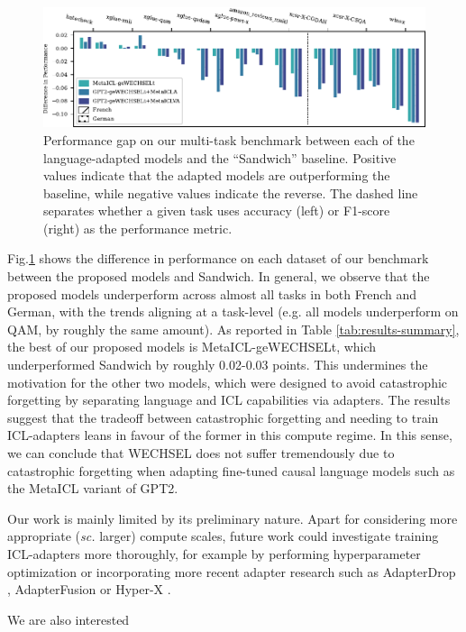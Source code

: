 \documentclass[11pt]{article}
\begin{document}
\begin{figure}[ht]
	\includegraphics{results.pdf}
	\caption{Performance gap on our multi-task benchmark between each of the language-adapted models
		and the ``Sandwich'' baseline. Positive values indicate that the adapted models are
		outperforming the baseline, while negative values indicate the reverse. The dashed line
		separates whether a given task uses accuracy (left) or F1-score (right) as the performance
		metric.}
	\label{fig:results}
\end{figure}

Fig.\@ \ref{fig:results} shows the difference in performance on each dataset of our benchmark
between the proposed models and Sandwich. In general, we observe that the proposed models
underperform across almost all tasks in both French and German, with the trends aligning at
a task-level (e.g. all models underperform on QAM, by roughly the same amount). As reported in Table
\ref{tab:results-summary}, the best of our proposed models is MetaICL-geWECHSELt, which
underperformed Sandwich by roughly 0.02-0.03 points. This undermines the motivation for the other
two models, which were designed to avoid catastrophic forgetting by separating language and ICL
capabilities via adapters. The results suggest that the tradeoff between catastrophic forgetting and
needing to train ICL-adapters leans in favour of the former in this compute regime. In this sense,
we can conclude that WECHSEL does not suffer tremendously due to catastrophic forgetting when
adapting fine-tuned causal language models such as the MetaICL variant of GPT2.

Our work is mainly limited by its preliminary nature. Apart for considering more appropriate
(\textit{sc.} larger) compute scales, future work could investigate training ICL-adapters more
thoroughly, for example by performing hyperparameter optimization or incorporating more recent
adapter research such as AdapterDrop \citep{ruckle_adapterdrop_2021}, AdapterFusion
\citep{pfeiffer_adapterfusion_2021} or Hyper-X \citep{ustun_hyper-x_2022}.

We are also interested
\end{document}
